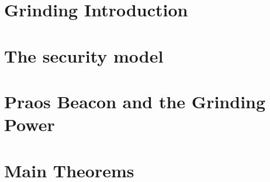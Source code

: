 \chapter{Grinding Introduction }\label{ch:grinding-intro}


\chapter{The security model}\label{sec:model-grinding}


% 

\chapter{Praos Beacon and the Grinding Power}\label{sec:praos}



% 


% 


\chapter{Main Theorems}\label{sec:praos-main-theorems}



% 


% 



